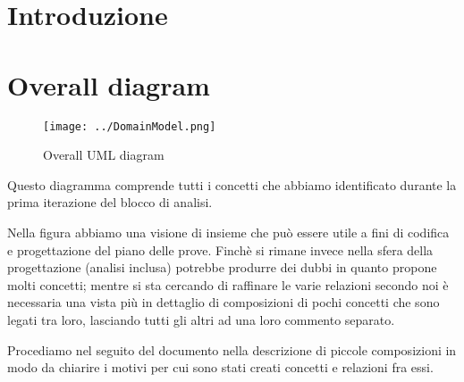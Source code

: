 \documentclass[a4paper, 12pt]{article}
\begin{document}
\newpage

\tableofcontents

\newpage

\section*{Introduzione}

\newpage

\section{Overall diagram}
\begin{figure}[h!] 
	\centering
	\texttt{[image: ../DomainModel.png]}
	\caption{Overall UML diagram}
	\label{fig:overallDiagram} 
\end{figure}

Questo diagramma comprende tutti i concetti che abbiamo identificato durante la
prima iterazione del blocco di analisi. 

Nella figura abbiamo una visione di insieme che pu\`o essere utile a fini di
codifica e progettazione del piano delle prove. Finch\`e si rimane invece nella
sfera della progettazione (analisi inclusa) potrebbe produrre dei dubbi in
quanto propone molti concetti; mentre si sta cercando di raffinare le varie relazioni
secondo noi \`e necessaria una vista pi\`u in dettaglio di composizioni
di pochi concetti che sono legati tra loro, lasciando tutti gli altri ad una
loro commento separato.

Procediamo nel seguito del documento nella descrizione di piccole composizioni
in modo da chiarire i motivi per cui sono stati creati concetti e relazioni fra
essi.







\end{document}
